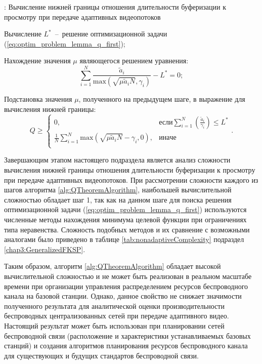 \begin{algorithm}
  \caption{: Вычисление нижней границы отношения длительности буферизации к просмотру при передаче адаптивных видеопотоков}
	\label{alg:QTheoremAlgorithm}
  \begin{algorithmic}[1]
	 \item Вычисление $L^{*}$~--~решение оптимизационной задачи (\ref{eq:optim_problem_lemma_q_first});
	 \item Нахождение значения $\mu$ являющегося решением уравнения: $$\sum\limits_{i=1}^{N} {\frac{\tilde{a}_i}{\mathrm{max} \left(\sqrt{\mu \tilde{a}_i N}, \gamma_i\right)}} - L^{*} = 0;$$
	\item Подстановка значения $\mu$, полученного на предыдущем шаге, в выражение для вычисления нижней границы:
	$$Q \geq
	\begin{cases}
	0, & \text{если} \sum\limits_{i=1}^{N} {\left(\frac{\tilde{a}_i}{\gamma_i}\right)} \leq L^{*}\\
	\frac{1}{N} \sum\limits_{i=1}^{N} {\mathrm{max} \left(\sqrt{\mu \tilde{a}_i N}-\gamma_i, 0\right)}, & \mathrm{иначе} \\
	\end{cases}.$$
  \end{algorithmic}
\end{algorithm}

Завершающим этапом настоящего подраздела является анализ сложности вычисления нижней границы отношения длительности буферизации к просмотру при передаче адаптивных видеопотоков. При рассмотрении сложности каждого из шагов алгоритма \ref{alg:QTheoremAlgorithm}, наибольшей вычислительной сложностью обладает шаг 1, так как на данном шаге для поиска решения оптимизационной задачи (\ref{eq:optim_problem_lemma_q_first}) используются численные методы нахождения минимума целевой функции при ограничениях типа неравенства. Сложность подобных методов и их сравнение с возможными аналогами было приведено в таблице \ref{tab:nonadaptiveComplexity} подраздел \ref{chap3:GeneralizedFKSP}.

Таким образом, алгоритм \ref{alg:QTheoremAlgorithm} обладает высокой вычислительной сложностью и не может быть реализован в реальном масштабе времени при организации управления распределением ресурсов беспроводного канала на базовой станции. Однако, данное свойство не снижает значимости полученного результата для аналитической оценки производительности беспроводных централизованных сетей при передаче адаптивного видео. Настоящий результат может быть использован при планировании сетей беспроводной связи (расположение и характеристики устанавливаемых базовых станций) и создания алгоритмов планирования ресурсов беспроводного канала для существующих и будущих стандартов беспроводной связи.

